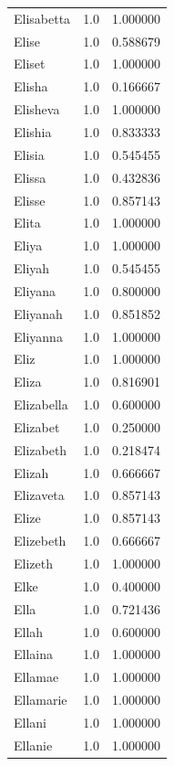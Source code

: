 \documentclass[
  letterpaper,
  DIV=11,
  numbers=noendperiod]{scrreprt}
\begin{document}
\begin{tabular}{lrr}
Elisabetta      &   1.0 &   1.000000 \\
Elise           &   1.0 &   0.588679 \\
Eliset          &   1.0 &   1.000000 \\
Elisha          &   1.0 &   0.166667 \\
Elisheva        &   1.0 &   1.000000 \\
Elishia         &   1.0 &   0.833333 \\
Elisia          &   1.0 &   0.545455 \\
Elissa          &   1.0 &   0.432836 \\
Elisse          &   1.0 &   0.857143 \\
Elita           &   1.0 &   1.000000 \\
Eliya           &   1.0 &   1.000000 \\
Eliyah          &   1.0 &   0.545455 \\
Eliyana         &   1.0 &   0.800000 \\
Eliyanah        &   1.0 &   0.851852 \\
Eliyanna        &   1.0 &   1.000000 \\
Eliz            &   1.0 &   1.000000 \\
Eliza           &   1.0 &   0.816901 \\
Elizabella      &   1.0 &   0.600000 \\
Elizabet        &   1.0 &   0.250000 \\
Elizabeth       &   1.0 &   0.218474 \\
Elizah          &   1.0 &   0.666667 \\
Elizaveta       &   1.0 &   0.857143 \\
Elize           &   1.0 &   0.857143 \\
Elizebeth       &   1.0 &   0.666667 \\
Elizeth         &   1.0 &   1.000000 \\
Elke            &   1.0 &   0.400000 \\
Ella            &   1.0 &   0.721436 \\
Ellah           &   1.0 &   0.600000 \\
Ellaina         &   1.0 &   1.000000 \\
Ellamae         &   1.0 &   1.000000 \\
Ellamarie       &   1.0 &   1.000000 \\
Ellani          &   1.0 &   1.000000 \\
Ellanie         &   1.0 &   1.000000 \\

\end{tabular}
\end{document}
